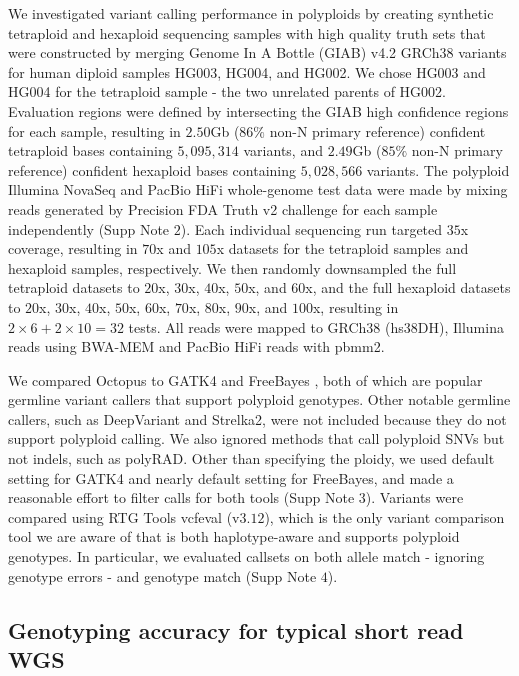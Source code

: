 \documentclass[notitlepage, twocolumn, 10pt]{article}
\begin{document}
We investigated variant calling performance in polyploids by creating synthetic tetraploid and hexaploid sequencing samples with high quality truth sets that were constructed by merging Genome In A Bottle (GIAB) v4.2 GRCh38 variants for human diploid samples HG003, HG004, and HG002. We chose HG003 and HG004 for the tetraploid sample - the two unrelated parents of HG002. Evaluation regions were defined by intersecting the GIAB high confidence regions for each sample, resulting in $2.50$Gb ($86\%$ non-N primary reference) confident tetraploid bases containing $5,095,314 $ variants, and $2.49$Gb ($85\%$ non-N primary reference) confident hexaploid bases containing $5,028,566$ variants. The polyploid Illumina NovaSeq and PacBio HiFi whole-genome test data were made by mixing reads generated by Precision FDA Truth v2 challenge for each sample independently (Supp Note $2$). Each individual sequencing run targeted $35$x coverage, resulting in $70$x and $105$x datasets for the tetraploid samples and hexaploid samples, respectively. We then randomly downsampled the full tetraploid datasets to $20$x, $30$x, $40$x, $50$x, and $60$x, and the full hexaploid datasets to $20$x, $30$x, $40$x, $50$x, $60$x, $70$x, $80$x, $90$x, and $100$x, resulting in $2 \times 6 + 2 \times 10 = 32$  tests. All reads were mapped to GRCh38 (hs38DH), Illumina reads using BWA-MEM and PacBio HiFi reads with pbmm2.

We compared Octopus to GATK4 \cite{RN598} and FreeBayes \cite{RN538}, both of which are popular germline variant callers that support polyploid genotypes. Other notable germline callers, such as DeepVariant and Strelka2, were not included because they do not support polyploid calling. We also ignored methods that  call polyploid SNVs but not indels, such as polyRAD. Other than specifying the ploidy, we used default setting for GATK4 and nearly default setting for FreeBayes, and made a reasonable effort to filter calls for both tools (Supp Note $3$). Variants were compared using RTG Tools vcfeval (v$3.12$), which is the only variant comparison tool we are aware of that is both haplotype-aware and supports polyploid genotypes. In particular, we evaluated callsets on both allele match - ignoring genotype errors - and genotype match (Supp Note $4$).

\subsection*{Genotyping accuracy for typical short read WGS}
\end{document}
